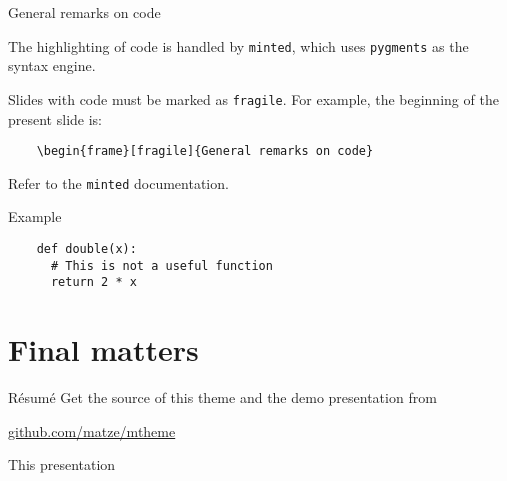 \documentclass[9pt, compress, aspectratio=169, serif]{beamer}
\begin{document}
\begin{frame}[fragile]{General remarks on code}

  The highlighting of code is handled by \texttt{minted}, which uses
  \texttt{pygments} as the syntax engine.

  Slides with code \alert{must} be marked as \texttt{fragile}. For example, the
  beginning of the present slide is:

  \begin{verbatim}
    \begin{frame}[fragile]{General remarks on code}
  \end{verbatim}

  Refer to the \texttt{minted} documentation.

\end{frame}

\begin{frame}[t,fragile]{Example}
  \begin{verbatim}
    def double(x):
      # This is not a useful function
      return 2 * x
  \end{verbatim}
\end{frame}

\section{Final matters}

\begin{frame}{Résumé}
  Get the source of this theme and the demo presentation from
  \begin{center}\url{github.com/matze/mtheme}\end{center}
  This presentation
  \begin{center}\ccbysa\end{center}
\end{frame}
\end{document}
